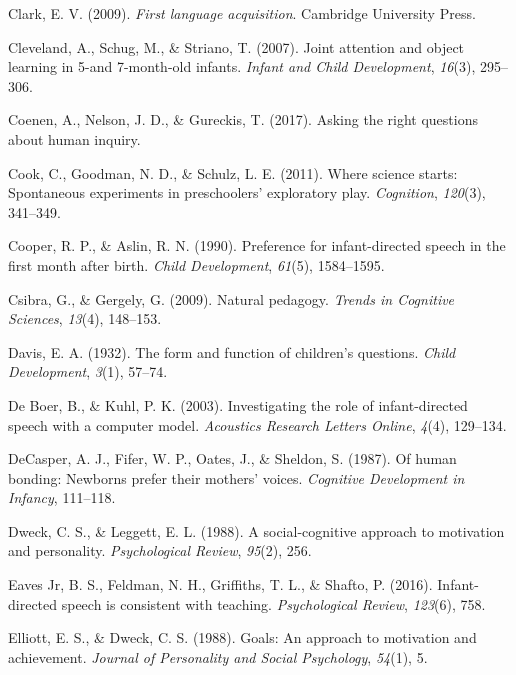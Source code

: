 \documentclass[english,man]{apa6}
\theoremstyle{definition}
\theoremstyle{definition}
\theoremstyle{definition}
\theoremstyle{remark}
\begin{document}
\hypertarget{ref-clark2009first}{}
Clark, E. V. (2009). \emph{First language acquisition}. Cambridge
University Press.

\hypertarget{ref-cleveland2007joint}{}
Cleveland, A., Schug, M., \& Striano, T. (2007). Joint attention and
object learning in 5-and 7-month-old infants. \emph{Infant and Child
Development}, \emph{16}(3), 295--306.

\hypertarget{ref-coenen2017asking}{}
Coenen, A., Nelson, J. D., \& Gureckis, T. (2017). Asking the right
questions about human inquiry.

\hypertarget{ref-cook2011science}{}
Cook, C., Goodman, N. D., \& Schulz, L. E. (2011). Where science starts:
Spontaneous experiments in preschoolers' exploratory play.
\emph{Cognition}, \emph{120}(3), 341--349.

\hypertarget{ref-cooper1990preference}{}
Cooper, R. P., \& Aslin, R. N. (1990). Preference for infant-directed
speech in the first month after birth. \emph{Child Development},
\emph{61}(5), 1584--1595.

\hypertarget{ref-csibra2009natural}{}
Csibra, G., \& Gergely, G. (2009). Natural pedagogy. \emph{Trends in
Cognitive Sciences}, \emph{13}(4), 148--153.

\hypertarget{ref-davis1932form}{}
Davis, E. A. (1932). The form and function of children's questions.
\emph{Child Development}, \emph{3}(1), 57--74.

\hypertarget{ref-de2003investigating}{}
De Boer, B., \& Kuhl, P. K. (2003). Investigating the role of
infant-directed speech with a computer model. \emph{Acoustics Research
Letters Online}, \emph{4}(4), 129--134.

\hypertarget{ref-decasper1987human}{}
DeCasper, A. J., Fifer, W. P., Oates, J., \& Sheldon, S. (1987). Of
human bonding: Newborns prefer their mothers' voices. \emph{Cognitive
Development in Infancy}, 111--118.

\hypertarget{ref-dweck1988social}{}
Dweck, C. S., \& Leggett, E. L. (1988). A social-cognitive approach to
motivation and personality. \emph{Psychological Review}, \emph{95}(2),
256.

\hypertarget{ref-eaves2016infant}{}
Eaves Jr, B. S., Feldman, N. H., Griffiths, T. L., \& Shafto, P. (2016).
Infant-directed speech is consistent with teaching. \emph{Psychological
Review}, \emph{123}(6), 758.

\hypertarget{ref-elliott1988goals}{}
Elliott, E. S., \& Dweck, C. S. (1988). Goals: An approach to motivation
and achievement. \emph{Journal of Personality and Social Psychology},
\emph{54}(1), 5.
\end{document}
